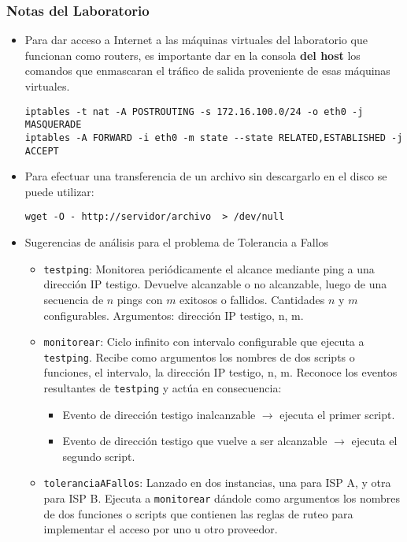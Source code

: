 \subsubsection{Notas del Laboratorio}
\begin{itemize}
	\item Para dar acceso a Internet a las máquinas virtuales del laboratorio que funcionan como routers, es importante dar en la consola \textbf{del host} los comandos que enmascaran el tráfico de salida proveniente de esas máquinas virtuales.
\begin{lstlisting}
iptables -t nat -A POSTROUTING -s 172.16.100.0/24 -o eth0 -j MASQUERADE
iptables -A FORWARD -i eth0 -m state --state RELATED,ESTABLISHED -j ACCEPT
\end{lstlisting}
	\item Para efectuar una transferencia de un archivo sin descargarlo en el disco se puede utilizar:
\begin{lstlisting}
wget -O - http://servidor/archivo  > /dev/null
\end{lstlisting}
\item Sugerencias de análisis para el problema de Tolerancia a Fallos
	\begin{itemize}
		\item \texttt{testping}: Monitorea periódicamente el alcance mediante ping a una dirección IP testigo. Devuelve alcanzable o no alcanzable, luego de una secuencia de $n$ pings con $m$ exitosos o fallidos. Cantidades $n$ y $m$ configurables. Argumentos: dirección IP testigo, n, m. 
		\item \texttt{monitorear}: Ciclo infinito con intervalo configurable que ejecuta a \texttt{testping}. Recibe como argumentos los nombres de dos scripts o funciones, el intervalo, la dirección IP testigo, n, m. Reconoce los eventos resultantes de \texttt{testping} y actúa en consecuencia:
		\begin{itemize}
			\item Evento de dirección testigo inalcanzable $\rightarrow$ ejecuta el primer script.
			\item Evento de dirección testigo que vuelve a ser alcanzable $\rightarrow$ ejecuta el segundo script.
		\end{itemize}
		\item \texttt{toleranciaAFallos}: Lanzado en dos instancias, una para ISP A, y otra para ISP B. Ejecuta a \texttt{monitorear} dándole como argumentos los nombres de dos funciones o scripts que contienen las reglas de ruteo para implementar el acceso por uno u otro proveedor. 
	\end{itemize}
\end{itemize}
